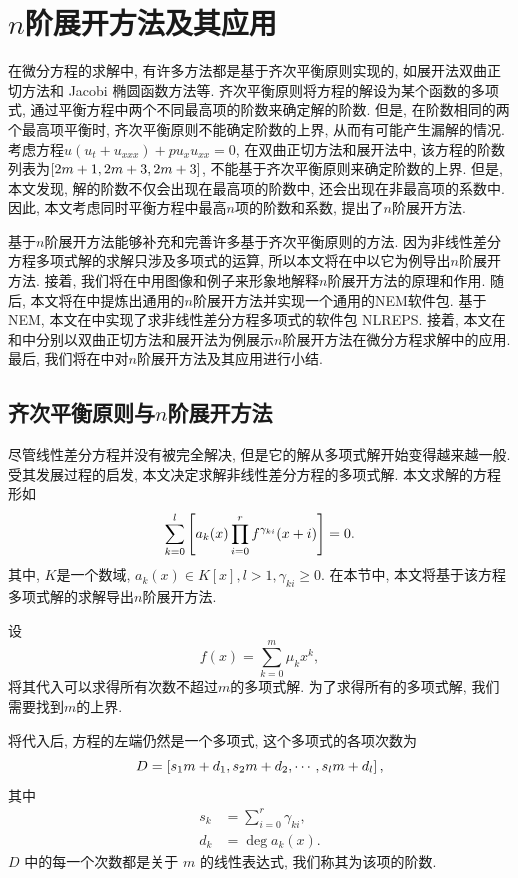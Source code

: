 \chapter{$n$阶展开方法及其应用}\label{ch04}
在微分方程的求解中, 有许多方法都是基于齐次平衡原则实现的, 如\Painleve{}展开法\D 双曲正切方法和 Jacobi 椭圆函数方法等. 齐次平衡原则将方程的解设为某个函数的多项式, 通过平衡方程中两个不同最高项的阶数来确定解的阶数. 但是, 在阶数相同的两个最高项平衡时, 齐次平衡原则不能确定阶数的上界, 从而有可能产生漏解的情况. 考虑方程$u(u_t+u_{xxx})+pu_x u_{xx}=0$, 在双曲正切方法和\Painleve{}展开法中, 该方程的阶数列表为$\left[2m+1,2m+3,2m+3\right]$, 不能基于齐次平衡原则来确定阶数的上界. 但是, 本文发现, 解的阶数不仅会出现在最高项的阶数中, 还会出现在非最高项的系数中. 因此, 本文考虑同时平衡方程中最高$n$项的阶数和系数, 提出了$n$阶展开方法. 

基于$n$阶展开方法能够补充和完善许多基于齐次平衡原则的方法. 因为非线性差分方程多项式解的求解只涉及多项式的运算, 所以本文将在中以它为例导出$n$阶展开方法. 接着, 我们将在中用图像和例子来形象地解释$n$阶展开方法的原理和作用. 随后, 本文将在中提炼出通用的$n$阶展开方法并实现一个通用的NEM软件包. 基于NEM, 本文在中实现了求非线性差分方程多项式的软件包 NLREPS. 接着, 本文在和中分别以双曲正切方法和\Painleve{}展开法为例展示$n$阶展开方法在微分方程求解中的应用. 最后, 我们将在中对$n$阶展开方法及其应用进行小结. 

\section{齐次平衡原则与$n$阶展开方法} \label{ch4sec1}
尽管线性差分方程并没有被完全解决, 但是它的解从多项式解开始变得越来越一般. 受其发展过程的启发, 本文决定求解非线性差分方程的多项式解. 本文求解的方程形如
\begin{equation}
\sum_{k=0}^l{\left[a_k(x)\prod_{i=0}^r{f^{\gamma_{ki}}(x+i)}\right]}=0.
\label{eq}
\end{equation}
其中, $K$是一个数域, $a_k(x)\in K[x], l>1, \gamma_{ki}\ge 0$. 在本节中, 本文将基于该方程多项式解的求解导出$n$阶展开方法. 

设
\begin{equation}
f(x)=\sum_{k=0}^m{\mu_kx^k},
\label{fm1}
\end{equation}
将其代入可以求得所有次数不超过$m$的多项式解. 为了求得所有的多项式解, 我们需要找到$m$的上界.

将代入后, 方程的左端仍然是一个多项式, 这个多项式的各项次数为
\begin{equation}
D = \left[s_1 m+d_1,s_2 m+d_2,\cdots,s_l m+d_l\right],
\end{equation}
其中
\begin{equation}
\begin{split}
s_k&=\sum_{i=0}^r{\gamma_{ki}}, \\
d_k&=\deg a_k(x).
\end{split}
\label{eq-sd}
\end{equation}
$D$ 中的每一个次数都是关于 $m$ 的线性表达式, 我们称其为该项的阶数.

